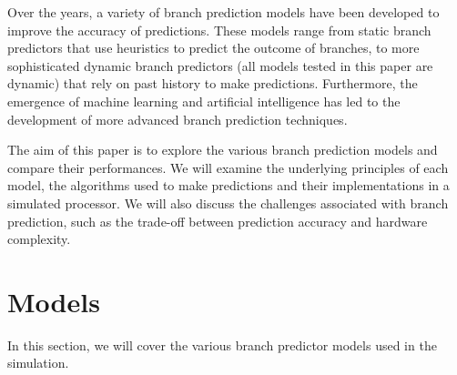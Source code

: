 \documentclass[conference]{IEEEtran}
\begin{document}
Over the years, a variety of branch prediction models have been developed to improve the accuracy of predictions. These models range from static branch predictors that use heuristics to predict the outcome of branches, to more sophisticated dynamic branch predictors (all models tested in this paper are dynamic) that rely on past history to make predictions. Furthermore, the emergence of  machine learning and artificial intelligence has led to the development of more advanced branch prediction techniques.

The aim of this paper is to explore the various branch prediction models and compare their performances. We will examine the underlying principles of each model, the algorithms used to make predictions and their implementations in a simulated processor. We will also discuss the challenges associated with branch prediction, such as the trade-off between prediction accuracy and hardware complexity.

\section{Models} \label{sec:models}
In this section, we will cover the various branch predictor models used in the simulation.
\end{document}
